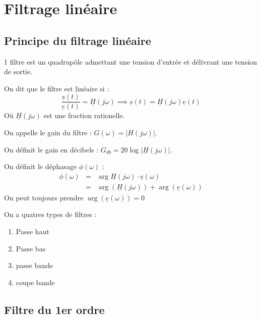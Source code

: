\chapter{Filtrage linéaire }
\section{Principe du filtrage linéaire}

\begin{definition}[Un filtre]
    1 filtre est un quadrupôle admettant une tension d'entrée et délivrant une tension de sortie. \par
    On dit que le filtre est linéaire si : 
    \[
        \frac{\underline{s}(t)}{\underline{e}(t)} = \underline{H}(j \omega ) \implies \underline{s}(t) = \underline{H}(j \omega ) \underline{e}(t )
    \]
    Où \(\underline{H}(j \omega )\) est une fraction rationelle.
\end{definition}

\begin{definition}[Gain]
    On appelle le gain du filtre  : \(G(\omega ) = \lvert H(j \omega ) \rvert \). \par
    On définit le gain en décibels : \(G_{db} = 20 \log \lvert \underline{H}( j \omega ) \rvert \). \par
    On définit le déphasage \(\phi (\omega )\) : 
    \begin{eqnarray*}
        \phi (\omega ) &=& \arg {\underline{H}(j \omega ) \cdot \underline{e}(\omega)} \\
        &=& \arg (\underline{H}(j \omega )) + \arg (\underline{e}(\omega ))
    \end{eqnarray*}
    On peut toujours prendre \(\arg (\underline{e}(\omega )) = 0 \) 
\end{definition}

\begin{definition}
    On a quatres types de filtres : 
    \begin{enumerate}
        \item Passe haut
        \item Passe bas
        \item passe bande
        \item coupe bande
    \end{enumerate}
\end{definition}

\section{Filtre du 1er ordre}
